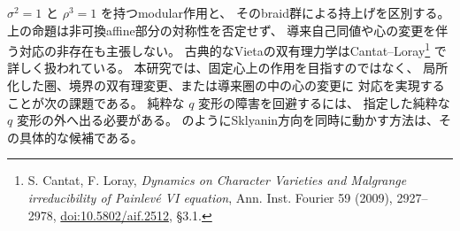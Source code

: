 \begin{remark}[今後構成すべきもの]
$\sigma^2=1$ と $\rho^3=1$ を持つmodular作用と、
そのbraid群による持上げを区別する。
上の命題は非可換affine部分の対称性を否定せず、
導来自己同値や心の変更を伴う対応の非存在も主張しない。
古典的なVietaの双有理力学はCantat--Loray\footnote{S. Cantat, F. Loray,
\emph{Dynamics on Character Varieties and Malgrange irreducibility of Painlev\'{e} VI equation},
Ann. Inst. Fourier 59 (2009), 2927--2978,
\href{https://doi.org/10.5802/aif.2512}{doi:10.5802/aif.2512}, \S3.1.}
で詳しく扱われている。
本研究では、固定心上の作用を目指すのではなく、
局所化した圏、境界の双有理変更、または導来圏の中の心の変更に
対応を実現することが次の課題である。
純粋な $q$ 変形の障害を回避するには、
指定した純粋な $q$ 変形の外へ出る必要がある。
\cite[三捩れから外へ出る全次数の変形]{CompanionE6}のようにSklyanin方向を同時に動かす方法は、その具体的な候補である。
\end{remark}

